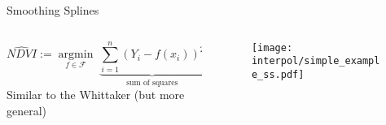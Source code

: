 \begin{frame}{Smoothing Splines}
    \begin{columns}
        \begin{column}{0.45\textwidth}
            $$\widehat{NDVI}  :=\underset{f \in \mathcal F}{\operatorname{argmin}}\;
                \underset{{\text{sum of squares}}}{\underbrace{{\sum_{i=1}^{n}\left(Y_{i}-{f}\left(x_{i}\right)\right)^{2} }}}
                + \lambda \underset{{\text{ smoothness}}}{\underbrace{{\int {f}^{\prime \prime}(x)^{2} d x}}}$$
            Similar to the Whittaker (but more general)
        
        \end{column}
        \begin{column}{0.45\textwidth}
            \begin{figure}
                \texttt{[image: interpol/simple\_example\_ss.pdf]}
            \end{figure}
        \end{column}
    \end{columns}
\end{frame}


